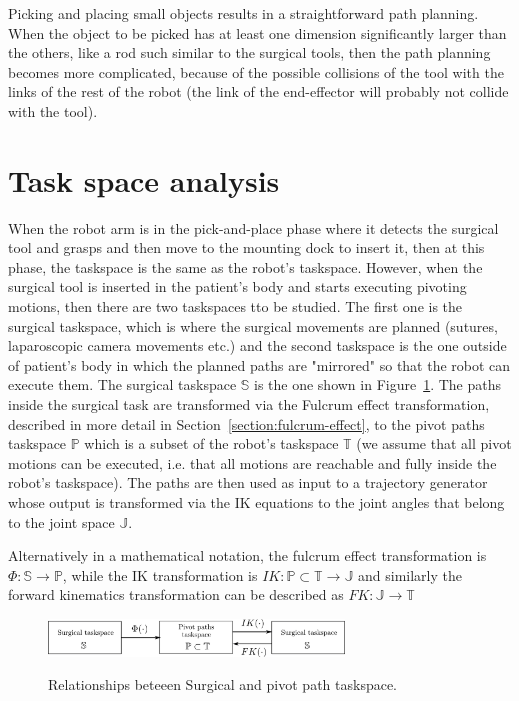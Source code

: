 Picking and placing small objects results in a straightforward path planning. When the object to be picked has at least one dimension significantly larger than the others, like a rod such similar to the surgical tools,  then the path planning becomes more complicated, because of the possible  collisions of the tool with the links of the rest of the robot (the link of the end-effector will probably not collide with the tool).
%
\section{Task space analysis}
%
When the robot arm is in the pick-and-place phase where it detects the surgical tool and grasps and then move to the mounting dock to insert it, then at this phase, the taskspace is the same as the robot's taskspace. However, when the surgical tool is inserted in the patient's body and starts executing pivoting motions, then there are two taskspaces tto be studied. The first one is the surgical taskspace, which is where the surgical movements are planned (sutures, laparoscopic camera movements etc.) and the second taskspace is the one outside of patient's body in which the planned paths are "mirrored" so that the robot can execute them. The surgical taskspace $\mathbb{S}$ is the one shown in Figure~\ref{surgical-taskspace}. The paths inside the surgical task are transformed via the Fulcrum effect transformation, described in more detail in Section~\ref{section:fulcrum-effect}, to the pivot paths taskspace $\mathbb{P}$ which is a subset of the robot's taskspace $\mathbb{T}$ (we assume that all pivot motions can be executed, i.e. that all motions are reachable and fully inside the robot's taskspace). The paths are then used as input to a trajectory generator whose output 
is transformed via the IK equations to the joint angles that belong to the joint space $\mathbb{J}$. 

Alternatively in a mathematical notation, the fulcrum effect transformation is $
Φ: \mathbb{S} \longrightarrow \mathbb{P}
$, while the IK transformation is $
IK: \mathbb{P} \subset \mathbb{T} \longrightarrow \mathbb{J}
$
and similarly the forward kinematics transformation can be described as $
FK: \mathbb{J} \longrightarrow \mathbb{T}
$\\
%
\begin{center}
\begin{figure}[!htb]
\centering
\includegraphics[width=0.7\textwidth]{images/spaces-and-transformations.png}\\
\caption{Relationships beteeen Surgical and pivot path taskspace.}
\label{surgical-taskspace}
\end{figure}
\end{center}

